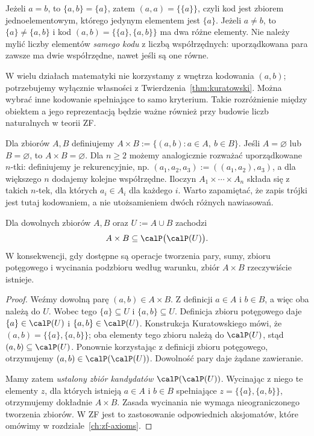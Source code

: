 \begin{przyklad}\label{ex:kuratowski-cases-xlii}
Jeżeli $a=b$, to $\{a,b\}=\{a\}$, zatem
$(a,a)=\{\{a\}\}$, czyli kod jest zbiorem
jednoelementowym, którego jedynym elementem jest $\{a\}$.
Jeżeli $a\ne b$, to $\{a\}\ne\{a,b\}$ i kod
$(a,b)=\{\{a\},\{a,b\}\}$ ma dwa różne elementy.
Nie należy mylić liczby elementów \emph{samego kodu}
z liczbą współrzędnych: uporządkowana para zawsze
ma dwie współrzędne, nawet jeśli są one równe.
\end{przyklad}


\begin{uwaga}
W wielu działach matematyki nie korzystamy z wnętrza kodowania
$(a,b)$; potrzebujemy wyłącznie własności
z Twierdzenia~\ref{thm:kuratowski}. Można wybrać inne
kodowanie spełniające to samo kryterium. Takie rozróżnienie
między obiektem a jego reprezentacją będzie ważne również
przy budowie liczb naturalnych w teorii ZF.
\end{uwaga}

\begin{definicja}\label{def:cartesian}
Dla zbiorów $A,B$ definiujemy
$A\times B:=\{(a,b):a\in A,\ b\in B\}$.
Jeśli $A=\varnothing$ lub $B=\varnothing$, to
$A\times B=\varnothing$.
Dla $n\ge2$ możemy analogicznie rozważać uporządkowane
$n$-tki: definiujemy je rekurencyjnie, np.
$(a_1,a_2,a_3):=((a_1,a_2),a_3)$, a dla większego
$n$ dodajemy kolejne współrzędne. Iloczyn
$A_1\times\cdots\times A_n$ składa się z takich
$n$-tek, dla których $a_i\in A_i$ dla każdego $i$.
Warto zapamiętać, że zapis trójki jest tutaj kodowaniem,
a nie utożsamieniem dwóch różnych nawiasowań.
\end{definicja}

\begin{twierdzenie}
\label{thm:cartesian-existence-xlii}
Dla dowolnych zbiorów $A,B$ oraz $U:=A\cup B$ zachodzi
\[
A\times B\subseteq\calP\bigl(\calP(U)\bigr).
\]
W konsekwencji, gdy dostępne są operacje tworzenia pary,
sumy, zbioru potęgowego i wycinania podzbioru według
warunku, zbiór $A\times B$ rzeczywiście istnieje.
\end{twierdzenie}
\begin{proof}
Weźmy dowolną parę $(a,b)\in A\times B$. Z definicji
$a\in A$ i $b\in B$, a więc oba należą do $U$.
Wobec tego $\{a\}\subseteq U$ i $\{a,b\}\subseteq U$.
Definicja zbioru potęgowego daje
$\{a\}\in\calP(U)$ i $\{a,b\}\in\calP(U)$.
Konstrukcja Kuratowskiego mówi, że
$(a,b)=\{\{a\},\{a,b\}\}$; oba elementy tego zbioru
należą do $\calP(U)$, stąd $(a,b)\subseteq\calP(U)$.
Ponownie korzystając z definicji zbioru potęgowego,
otrzymujemy $(a,b)\in\calP(\calP(U))$.
Dowolność pary daje żądane zawieranie.

Mamy zatem \emph{ustalony zbiór kandydatów}
$\calP(\calP(U))$. Wycinając z niego te elementy $z$,
dla których istnieją $a\in A$ i $b\in B$ spełniające
$z=\{\{a\},\{a,b\}\}$, otrzymujemy dokładnie
$A\times B$. Zasada wycinania nie wymaga
nieograniczonego tworzenia zbiorów. W ZF jest to
zastosowanie odpowiednich aksjomatów, które
omówimy w rozdziale~\ref{ch:zf-axioms}.
\end{proof}


